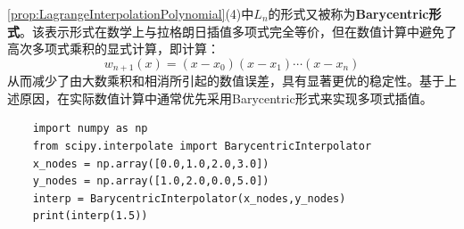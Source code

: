 \begin{note}
	\cref{prop:LagrangeInterpolationPolynomial}(4)中$L_n$的形式又被称为\textbf{Barycentric形式}。该表示形式在数学上与拉格朗日插值多项式完全等价，但在数值计算中避免了高次多项式乘积的显式计算，即计算：
	\begin{equation*}
		w_{n+1}(x)=(x-x_0)(x-x_1)\cdots(x-x_n)
	\end{equation*}
	从而减少了由大数乘积和相消所引起的数值误差，具有显著更优的稳定性。基于上述原因，在实际数值计算中通常优先采用Barycentric形式来实现多项式插值。
\end{note}
\begin{verbatim}
	import numpy as np
	from scipy.interpolate import BarycentricInterpolator
	x_nodes = np.array([0.0,1.0,2.0,3.0])
	y_nodes = np.array([1.0,2.0,0.0,5.0])
	interp = BarycentricInterpolator(x_nodes,y_nodes)
	print(interp(1.5))
\end{verbatim}
